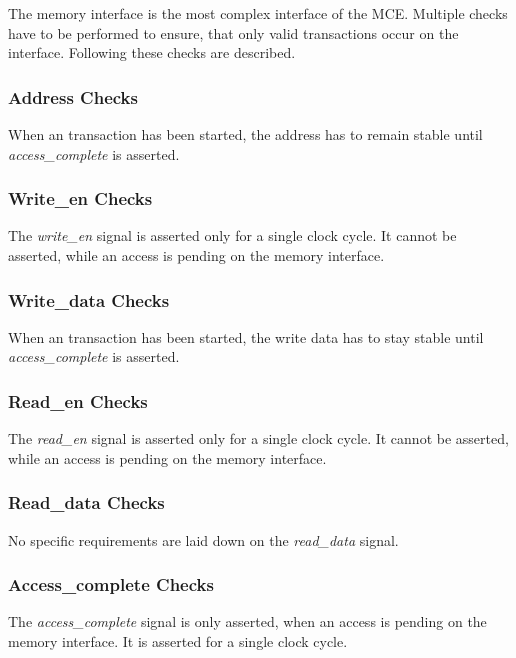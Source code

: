 The memory interface is the most complex interface of the MCE. Multiple checks have to be performed to ensure, that only valid transactions occur on the
interface. Following these checks are described.

\subsubsection{Address Checks}

When an transaction has been started, the address has to remain stable until \emph{access\_complete} is asserted.

\subsubsection{Write\_en Checks}

The \emph{write\_en} signal is asserted only for a single clock cycle. It cannot be asserted, while an access is pending on the memory interface.

\subsubsection{Write\_data Checks}

When an transaction has been started, the write data has to stay stable until \emph{access\_complete} is asserted.

\subsubsection{Read\_en Checks}

The \emph{read\_en} signal is asserted only for a single clock cycle. It cannot be asserted, while an access is pending on the memory interface.

\subsubsection{Read\_data Checks}

No specific requirements are laid down on the \emph{read\_data} signal.

\subsubsection{Access\_complete Checks}

The \emph{access\_complete} signal is only asserted, when an access is pending on the memory interface.
It is asserted for a single clock cycle.

